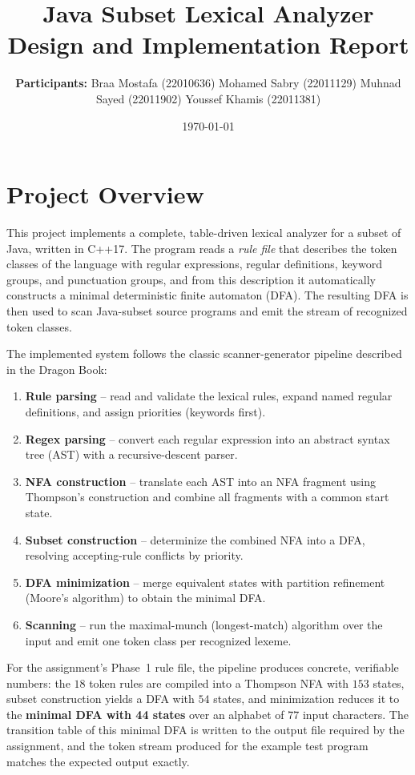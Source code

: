 \documentclass[11pt,a4paper]{article}
\title{Java Subset Lexical Analyzer\\\large Design and Implementation Report}
\author{\textbf{Participants:}\n
Braa Mostafa (22010636)\n
Mohamed Sabry (22011129)\n
Muhnad Sayed (22011902)\n
Youssef Khamis (22011381)}
\date{\today}
\begin{document}
\maketitle
\newpage

\section{Project Overview}
This project implements a complete, table-driven lexical analyzer for a subset of
Java, written in C++17. The program reads a \emph{rule file} that describes the
token classes of the language with regular expressions, regular definitions,
keyword groups, and punctuation groups, and from this description it
automatically constructs a minimal deterministic finite automaton (DFA). The
resulting DFA is then used to scan Java-subset source programs and emit the
stream of recognized token classes.

The implemented system follows the classic scanner-generator pipeline described
in the Dragon Book:
\begin{enumerate}
    \item \textbf{Rule parsing} -- read and validate the lexical rules, expand
          named regular definitions, and assign priorities (keywords first).
    \item \textbf{Regex parsing} -- convert each regular expression into an
          abstract syntax tree (AST) with a recursive-descent parser.
    \item \textbf{NFA construction} -- translate each AST into an NFA fragment
          using Thompson's construction and combine all fragments with a common
          start state.
    \item \textbf{Subset construction} -- determinize the combined NFA into a
          DFA, resolving accepting-rule conflicts by priority.
    \item \textbf{DFA minimization} -- merge equivalent states with partition
          refinement (Moore's algorithm) to obtain the minimal DFA.
    \item \textbf{Scanning} -- run the maximal-munch (longest-match) algorithm
          over the input and emit one token class per recognized lexeme.
\end{enumerate}

For the assignment's Phase~1 rule file, the pipeline produces concrete,
verifiable numbers: the $18$ token rules are compiled into a Thompson NFA with
$153$ states, subset construction yields a DFA with $54$ states, and
minimization reduces it to the \textbf{minimal DFA with 44 states} over an
alphabet of $77$ input characters. The transition table of this minimal DFA is
written to the output file required by the assignment, and the token stream
produced for the example test program matches the expected output exactly.
\end{document}
